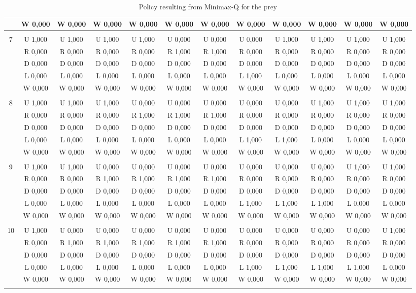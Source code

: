 \begin{table}[htbp]
\begin{tiny}
\begin{tabular}{c|c|c|c|c|c|c|c|c|c|c|c|}
&W 0,000&W 0,000&W 0,000&W 0,000&W 0,000&W 0,000&W 0,000&W 0,000&W 0,000&W 0,000&W 0,000\\
\hline \\
7&U 1,000&U 1,000&U 1,000&U 1,000&U 0,000&U 0,000&U 0,000&U 1,000&U 1,000&U 1,000&U 1,000\\
&R 0,000&R 0,000&R 0,000&R 0,000&R 1,000&R 1,000&R 0,000&R 0,000&R 0,000&R 0,000&R 0,000\\
&D 0,000&D 0,000&D 0,000&D 0,000&D 0,000&D 0,000&D 0,000&D 0,000&D 0,000&D 0,000&D 0,000\\
&L 0,000&L 0,000&L 0,000&L 0,000&L 0,000&L 0,000&L 1,000&L 0,000&L 0,000&L 0,000&L 0,000\\
&W 0,000&W 0,000&W 0,000&W 0,000&W 0,000&W 0,000&W 0,000&W 0,000&W 0,000&W 0,000&W 0,000\\
\hline \\
8&U 1,000&U 1,000&U 1,000&U 0,000&U 0,000&U 0,000&U 0,000&U 0,000&U 1,000&U 1,000&U 1,000\\
&R 0,000&R 0,000&R 0,000&R 1,000&R 1,000&R 1,000&R 0,000&R 0,000&R 0,000&R 0,000&R 0,000\\
&D 0,000&D 0,000&D 0,000&D 0,000&D 0,000&D 0,000&D 0,000&D 0,000&D 0,000&D 0,000&D 0,000\\
&L 0,000&L 0,000&L 0,000&L 0,000&L 0,000&L 0,000&L 1,000&L 1,000&L 0,000&L 0,000&L 0,000\\
&W 0,000&W 0,000&W 0,000&W 0,000&W 0,000&W 0,000&W 0,000&W 0,000&W 0,000&W 0,000&W 0,000\\
\hline \\
9&U 1,000&U 1,000&U 0,000&U 0,000&U 0,000&U 0,000&U 0,000&U 0,000&U 0,000&U 1,000&U 1,000\\
&R 0,000&R 0,000&R 1,000&R 1,000&R 1,000&R 1,000&R 0,000&R 0,000&R 0,000&R 0,000&R 0,000\\
&D 0,000&D 0,000&D 0,000&D 0,000&D 0,000&D 0,000&D 0,000&D 0,000&D 0,000&D 0,000&D 0,000\\
&L 0,000&L 0,000&L 0,000&L 0,000&L 0,000&L 0,000&L 1,000&L 1,000&L 1,000&L 0,000&L 0,000\\
&W 0,000&W 0,000&W 0,000&W 0,000&W 0,000&W 0,000&W 0,000&W 0,000&W 0,000&W 0,000&W 0,000\\
\hline \\
10&U 1,000&U 0,000&U 0,000&U 0,000&U 0,000&U 0,000&U 0,000&U 0,000&U 0,000&U 0,000&U 1,000\\
&R 0,000&R 1,000&R 1,000&R 1,000&R 1,000&R 1,000&R 0,000&R 0,000&R 0,000&R 0,000&R 0,000\\
&D 0,000&D 0,000&D 0,000&D 0,000&D 0,000&D 0,000&D 0,000&D 0,000&D 0,000&D 0,000&D 0,000\\
&L 0,000&L 0,000&L 0,000&L 0,000&L 0,000&L 0,000&L 1,000&L 1,000&L 1,000&L 1,000&L 0,000\\
&W 0,000&W 0,000&W 0,000&W 0,000&W 0,000&W 0,000&W 0,000&W 0,000&W 0,000&W 0,000&W 0,000\\
\hline \\
\end{tabular}
\end{tiny}
\caption{Policy resulting from Minimax-Q for the prey}
\end{table}


